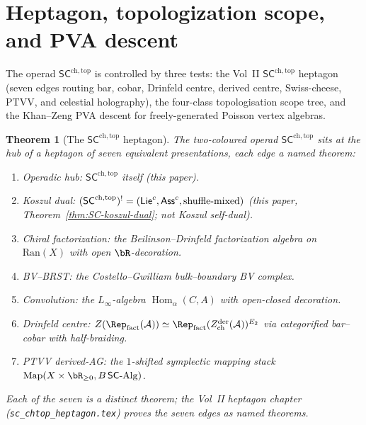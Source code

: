\documentclass[11pt,reqno]{amsart}
\newtheorem{theorem}{Theorem}[section]
\theoremstyle{definition}
\theoremstyle{remark}
\newcommand{\cA}{\mathcal{A}}
\newcommand{\Ran}{\mathrm{Ran}}
\newcommand{\SC}{\mathsf{SC}}
\newcommand{\SCchtop}{\mathsf{SC}^{\mathrm{ch,top}}}
\newcommand{\Ass}{\mathsf{Ass}}
\newcommand{\Lie}{\mathsf{Lie}}
\DeclareMathOperator{\Hom}{Hom}
\numberwithin{equation}{section}
\begin{document}

\section{Heptagon, topologization scope, and PVA descent}
\label{sec:schtop-heptagon}

The operad $\SCchtop$ is controlled by three tests: the Vol~II
$\SCchtop$ heptagon (seven edges routing bar, cobar, Drinfeld
centre, derived centre, Swiss-cheese, PTVV, and celestial
holography), the four-class topologisation scope tree, and the
Khan--Zeng PVA descent for freely-generated Poisson vertex algebras.

\begin{theorem}[The $\SCchtop$ heptagon]
\label{thm:schtop-heptagon}
The two-coloured operad $\SCchtop$ sits at the hub of a heptagon of
seven equivalent presentations, each edge a named theorem:
\begin{enumerate}[(1)]
\item \emph{Operadic hub:} $\SCchtop$ itself (this paper).
\item \emph{Koszul dual:} $(\SCchtop)^! = (\Lie^c, \Ass^c,
  \textup{shuffle-mixed})$ (this paper, Theorem~\ref{thm:SC-koszul-dual};
  \emph{not} Koszul self-dual).
\item \emph{Chiral factorization:} the Beilinson--Drinfeld
  factorization algebra on $\Ran(X)$ with open $\bR$-decoration.
\item \emph{BV--BRST:} the Costello--Gwilliam bulk--boundary
  BV complex.
\item \emph{Convolution:} the $L_\infty$-algebra
  $\Hom_\alpha(C,A)$ with open-closed decoration.
\item \emph{Drinfeld centre:} $Z(\Rep_{\mathrm{fact}}(\cA)) \simeq
  \Rep_{\mathrm{fact}}(Z^{\mathrm{der}}_{\mathrm{ch}}(\cA))^{E_2}$
  via categorified bar--cobar with half-braiding.
\item \emph{PTVV derived-AG:} the $1$-shifted symplectic mapping
  stack $\mathrm{Map}(X \times \bR_{\ge 0}, B\,\SC\text{-}\mathrm{Alg})$.
\end{enumerate}
Each of the seven is a distinct theorem; the Vol~II heptagon
chapter (\texttt{sc\_chtop\_heptagon.tex}) proves the seven
edges as named theorems.
\end{theorem}
\end{document}
